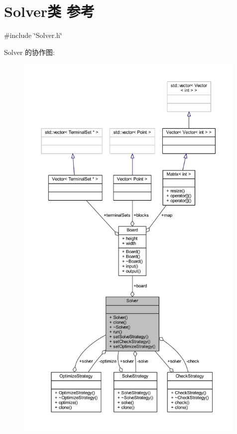 \hypertarget{classSolver}{}\section{Solver类 参考}
\label{classSolver}


{\ttfamily \#include \char`\"{}Solver.\+h\char`\"{}}



Solver 的协作图\+:
\nopagebreak
\begin{figure}[H]
\begin{center}
\leavevmode
\includegraphics[height=550pt]{classSolver__coll__graph}
\end{center}
\end{figure}
